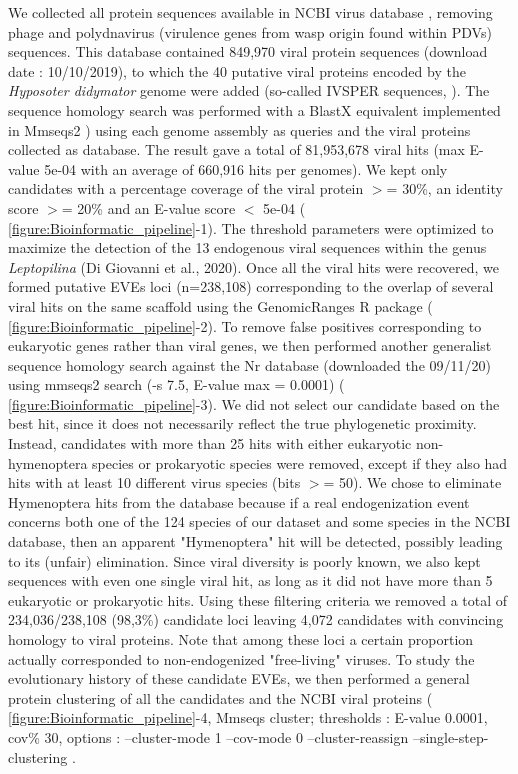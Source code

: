 We collected all protein sequences available in NCBI virus database \citep{hatcher_virus_2017}, removing phage and polydnavirus (virulence genes from wasp origin found within PDVs) sequences. This database contained 849,970 viral protein sequences (download date : 10/10/2019), to which the 40 putative viral proteins encoded by the \textit{Hyposoter didymator} genome were added (so-called IVSPER sequences, \citep{volkoff_analysis_2010-1}). The sequence homology search was performed with a BlastX equivalent implemented in Mmseqs2 \citep{steinegger_mmseqs2_2017}) using each genome assembly as queries and the viral proteins collected as database. The result gave a total of 81,953,678 viral hits (max E-value 5e-04 with an average of 660,916 hits per genomes). We kept only candidates with a percentage coverage of the viral protein $>$= 30\%, an identity score $>$= 20\% and an E-value score $<$ 5e-04 (\figurename{ \ref{figure:Bioinformatic_pipeline}}-1). The threshold parameters were optimized to maximize the detection of the 13 endogenous viral sequences within the genus \textit{Leptopilina} (Di Giovanni et al., 2020). Once all the viral hits were recovered, we formed putative EVEs loci (n=238,108) corresponding to the overlap of several viral hits on the same scaffold using the GenomicRanges R package \citep{lawrence_software_2013} (\figurename{ \ref{figure:Bioinformatic_pipeline}}-2).
To remove false positives corresponding to eukaryotic genes rather than viral genes, we then performed another generalist sequence homology search against the Nr database (downloaded the 09/11/20) using mmseqs2 search (-s 7.5, E-value max = 0.0001) (\figurename{ \ref{figure:Bioinformatic_pipeline}}-3). We did not select our candidate based on the best hit, since it does not necessarily reflect the true phylogenetic proximity. Instead, candidates with more than 25 hits with either eukaryotic non-hymenoptera species or prokaryotic species were removed, except if they also had hits with at least 10 different virus species (bits $>$= 50). We chose to eliminate Hymenoptera hits from the database because if a real endogenization event concerns both one of the 124 species of our dataset and some species in the NCBI database, then an apparent "Hymenoptera" hit will be detected, possibly leading to its (unfair) elimination.
Since viral diversity is  poorly known, we also kept sequences with even one single viral hit, as long as it did not have more than 5 eukaryotic  or prokaryotic hits. Using these filtering criteria we removed a total of 234,036/238,108 (98,3\%) candidate loci leaving 4,072 candidates with convincing homology to viral proteins. Note that among these loci a certain proportion actually corresponded to non-endogenized "free-living" viruses. To study the evolutionary history of these candidate EVEs, we then performed a general protein clustering of all the candidates and the NCBI viral proteins (\figurename{ \ref{figure:Bioinformatic_pipeline}}-4, Mmseqs cluster; thresholds : E-value 0.0001, cov\% 30, options : --cluster-mode 1 --cov-mode 0 --cluster-reassign --single-step-clustering \citep{steinegger_clustering_2018}.

